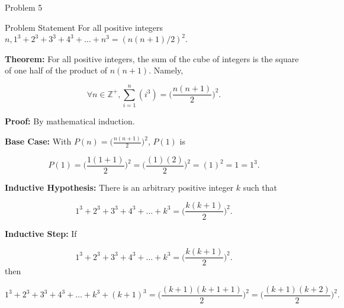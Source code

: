 \begin{problem}{Problem 5}
    \begin{statement}{Problem Statement}
        For all positive integers $n, 1^{3} + 2^{3} + 3^{3} + 4^{3} + \dots + n^{3} = (n(n + 1)/2)^{2}$.
    \end{statement}

    \begin{highlight}[Solution]
        \noindent \textbf{Theorem:} For all positive integers, the sum of the cube of integers is the square of one half of the product of $n(n + 1)$. Namely,

        \begin{equation*}
            \forall n \in \mathbb{Z}^{+}, \sum_{i = 1}^{n} (i^{3}) = \Big(\frac{n(n + 1)}{2}\Big)^{2}.
        \end{equation*}

        \noindent \textbf{Proof:} By mathematical induction. \vspace*{1em}

        \noindent \textbf{Base Case:} With $P(n) = \Big(\frac{n(n + 1)}{2}\Big)^{2}$, $P(1)$ is 

        \begin{equation*}
            P(1) = \Big(\frac{1(1 + 1)}{2}\Big)^{2} = \Big(\frac{(1)(2)}{2}\Big)^{2} = (1)^{2} = 1 = 1^{3}.
        \end{equation*}

        \noindent \textbf{Inductive Hypothesis:} There is an arbitrary positive integer $k$ such that

        \begin{equation*}
            1^{3} + 2^{3} + 3^{3} + 4^{3} + \dots + k^{3} = \Big(\frac{k(k + 1)}{2}\Big)^{2}.
        \end{equation*}

        \noindent \textbf{Inductive Step:} If 

        \begin{equation*}
            1^{3} + 2^{3} + 3^{3} + 4^{3} + \dots + k^{3} = \Big(\frac{k(k + 1)}{2}\Big)^{2}.
        \end{equation*}
        then

        \begin{equation*}
            1^{3} + 2^{3} + 3^{3} + 4^{3} + \dots + k^{3} + (k + 1)^{3} = \Big(\frac{(k + 1)(k + 1 + 1)}{2}\Big)^{2} = \Big(\frac{(k + 1)(k + 2)}{2}\Big)^{2}.
        \end{equation*}


\end{highlight}
\end{problem}
